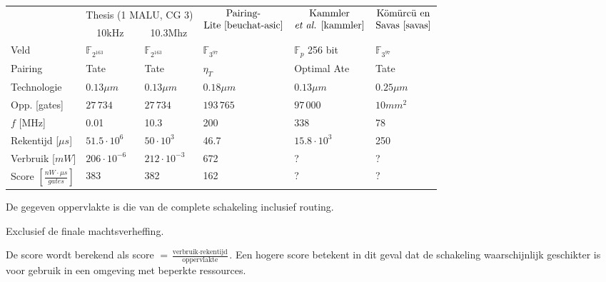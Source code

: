 \begin{table}[h]
	\begin{narrow}{-1cm}{-1cm}
		\centering
		\begin{tabular}{llllll}
			\toprule
			&	\multicolumn{2}{c}{Thesis (1 MALU, CG 3)}	& \multirow{2}{*}{$\begin{array}{@{}c@{}}\text{Pairing-}\\\text{Lite \cite{beuchat-asic}}\end{array}$}	& \multicolumn{1}{c}{\multirow{2}{*}{$\begin{array}{@{}c@{}}\text{Kammler}\\\text{\emph{et al.} \cite{kammler}}\end{array}$}}	&  \multicolumn{1}{c}{\multirow{2}{*}{$\begin{array}{@{}c@{}}\text{K\"om\"urc\"u en}\\\text{Savas \cite{savas}}\end{array}$}}\\
			\cmidrule(r){2-3}
			& \multicolumn{1}{c}{10kHz} & \multicolumn{1}{c}{10.3Mhz} & & &\\
	 		\midrule
			Veld																		& $\mathbb{F}_{2^{163}}$	& $\mathbb{F}_{2^{163}}$	& $\mathbb{F}_{3^{97}}$	& $\mathbb{F}_{p}$ 256 bit	& $\mathbb{F}_{3^{97}}$ \\
			Pairing																	& Tate							& Tate							& $\eta_T$					& Optimal Ate 					& Tate\\
			Technologie																& $0.13 \mu m$					& $0.13 \mu m$					& $0.18 \mu m$				& $0.13 \mu m$					& $0.25 \mu m$\\
			Opp. [gates]															& $27\,734$						& $27\,734$						& $193\,765$				& $97\,000$						& \emph{$10mm^2$}\footnotemark[2]\\
			$f$ [MHz]																& 0.01							& 10.3							& 200							& 338								& 78\\
			Rekentijd [$\mu s$]													& $51.5 \cdot 10^6$			& $50 \cdot 10^3$				& 46.7						& $15.8 \cdot 10^3$			& 250\footnotemark[3]\\
			Verbruik [$mW$]														& $206 \cdot 10^{-6}$		& $212 \cdot 10^{-3}$		& 672							& ?								& ?\\
			Score $[\frac{nW \cdot \mu s}{gates}]$\footnotemark[4]	& 383								& 382								& 162							& ?								& ?\\
			\bottomrule		
		\end{tabular}
	\end{narrow}
	\footnotesize \footnotemark[2] De gegeven oppervlakte is die van de complete schakeling inclusief routing.
	
	\footnotemark[3] Exclusief de finale machtsverheffing.
	
	\footnotemark[4] De score wordt berekend als score $= \frac{\text{verbruik} \cdot \text{rekentijd}}{\text{oppervlakte}}$. Een hogere score betekent in dit geval dat de schakeling waarschijnlijk geschikter is voor gebruik in een omgeving met beperkte ressources.
\end{table}
